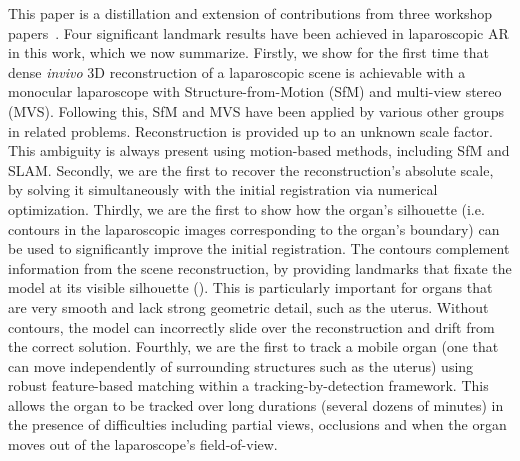 This paper is a distillation and extension of contributions from three workshop papers~\cite{Collins2044,Collins2013,Collins2017System}. Four significant landmark results have been achieved in laparoscopic AR in this work, which we now summarize. Firstly, we show for the first time that dense \textit{invivo} 3D reconstruction of a laparoscopic scene is achievable with a monocular laparoscope with Structure-from-Motion (SfM) and multi-view stereo (MVS). Following this, SfM and MVS have been applied by various other groups in related problems. Reconstruction is provided up to an unknown scale factor. %
This ambiguity is always present using motion-based methods, including SfM and SLAM. %
Secondly, we are the first to recover the reconstruction's absolute scale, by solving it simultaneously with the initial registration via numerical optimization. %
Thirdly, we are the first to show how the organ's silhouette (i.e. contours in the laparoscopic images corresponding to the organ's boundary) can be used to significantly improve the initial registration. The contours complement information from the scene reconstruction, by providing landmarks that fixate the model at its visible silhouette (). This is particularly important for organs that are very smooth and lack strong geometric detail, such as the uterus. Without contours, the model can incorrectly slide over the reconstruction and drift from the correct solution. Fourthly, we are the first to track a mobile organ (one that can move independently of surrounding structures such as the uterus) using robust feature-based matching within a tracking-by-detection framework. This allows the organ to be tracked over long durations (\ie several dozens of minutes) in the presence of difficulties including partial views, occlusions and when the organ moves out of the laparoscope's field-of-view.

